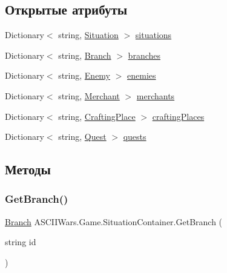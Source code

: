 \subsection*{Открытые атрибуты}
\begin{DoxyCompactItemize}
\item 
Dictionary$<$ string, \hyperlink{class_a_s_c_i_i_wars_1_1_game_1_1_situation}{Situation} $>$ \hyperlink{class_a_s_c_i_i_wars_1_1_game_1_1_situation_container_a24a982285b5782ecee43e98205d056c1}{situations}
\item 
Dictionary$<$ string, \hyperlink{class_a_s_c_i_i_wars_1_1_game_1_1_branch}{Branch} $>$ \hyperlink{class_a_s_c_i_i_wars_1_1_game_1_1_situation_container_af99ccf46ddcb93df3aa8ca830be1d2cd}{branches}
\item 
Dictionary$<$ string, \hyperlink{class_a_s_c_i_i_wars_1_1_game_1_1_enemy}{Enemy} $>$ \hyperlink{class_a_s_c_i_i_wars_1_1_game_1_1_situation_container_ae83c07e8b05da394daebe44f00e4f4d2}{enemies}
\item 
Dictionary$<$ string, \hyperlink{class_a_s_c_i_i_wars_1_1_game_1_1_merchant}{Merchant} $>$ \hyperlink{class_a_s_c_i_i_wars_1_1_game_1_1_situation_container_ad941813542c7012bd5867cc7962f1fee}{merchants}
\item 
Dictionary$<$ string, \hyperlink{class_a_s_c_i_i_wars_1_1_game_1_1_crafting_place}{Crafting\+Place} $>$ \hyperlink{class_a_s_c_i_i_wars_1_1_game_1_1_situation_container_a289c9b8afd2b2d3561f850e4ce6a4e0b}{crafting\+Places}
\item 
Dictionary$<$ string, \hyperlink{class_a_s_c_i_i_wars_1_1_game_1_1_quest}{Quest} $>$ \hyperlink{class_a_s_c_i_i_wars_1_1_game_1_1_situation_container_a1f019ada2eabbee7c5e51ecf9ce8d75a}{quests}
\end{DoxyCompactItemize}


\subsection{Методы}
\hypertarget{class_a_s_c_i_i_wars_1_1_game_1_1_situation_container_a3bab9a3b20ced9a6b3408601ff381b51}{}\label{class_a_s_c_i_i_wars_1_1_game_1_1_situation_container_a3bab9a3b20ced9a6b3408601ff381b51} 
\subsubsection{\texorpdfstring{Get\+Branch()}{GetBranch()}}
{\footnotesize\ttfamily \hyperlink{class_a_s_c_i_i_wars_1_1_game_1_1_branch}{Branch} A\+S\+C\+I\+I\+Wars.\+Game.\+Situation\+Container.\+Get\+Branch (\begin{DoxyParamCaption}\item[{string}]{id }\end{DoxyParamCaption})\hspace{0.3cm}{\ttfamily [inline]}}

